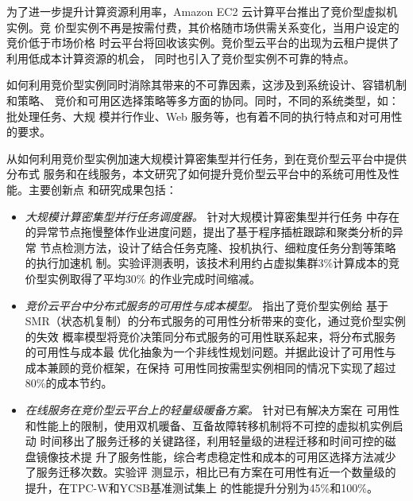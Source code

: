 \begin{cabstract}
  为了进一步提升计算资源利用率，Amazon EC2 云计算平台推出了竞价型虚拟机实例。竞
  价型实例不再是按需付费，其价格随市场供需关系变化，当用户设定的竞价低于市场价格
  时云平台将回收该实例。竞价型云平台的出现为云租户提供了利用低成本计算资源的机会，
  同时也引入了竞价型实例不可靠的特点。

  如何利用竞价型实例同时消除其带来的不可靠因素，这涉及到系统设计、容错机制和策略、
  竞价和可用区选择策略等多方面的协同。同时，不同的系统类型，如：批处理任务、大规
  模并行作业、Web 服务等，也有着不同的执行特点和对可用性的要求。

  从如何利用竞价型实例加速大规模计算密集型并行任务，到在竞价型云平台中提供分布式
  服务和在线服务，本文研究了如何提升竞价型云平台中的系统可用性及性能。主要创新点
  和研究成果包括：
  \begin{itemize}
    \item \emph{大规模计算密集型并行任务调度器。} 针对大规模计算密集型并行任务
    中存在的异常节点拖慢整体作业进度问题，提出了基于程序插桩跟踪和聚类分析的异常
    节点检测方法，设计了结合任务克隆、投机执行、细粒度任务分割等策略的执行加速机
    制。实验评测表明，该技术利用约占虚拟集群3\%计算成本的竞价型实例取得了平均30\%
    的作业完成时间缩减。
    \item \emph{竞价云平台中分布式服务的可用性与成本模型。} 指出了竞价型实例给
    基于SMR（状态机复制）的分布式服务的可用性分析带来的变化，通过竞价型实例的失效
    概率模型将竞价决策同分布式服务的可用性联系起来，将分布式服务的可用性与成本最
    优化抽象为一个非线性规划问题。并据此设计了可用性与成本兼顾的竞价框架，在保持
    可用性同按需型实例相同的情况下实现了超过80\%的成本节约。
    \item \emph{在线服务在竞价型云平台上的轻量级暖备方案。} 针对已有解决方案在
    可用性和性能上的限制，使用双机暖备、互备故障转移机制将不可控的虚拟机实例启动
    时间移出了服务迁移的关键路径，利用轻量级的进程迁移和时间可控的磁盘镜像技术提
    升了服务性能，综合考虑稳定性和成本的可用区选择方法减少了服务迁移次数。实验评
    测显示，相比已有方案在可用性有近一个数量级的提升，在TPC-W和YCSB基准测试集上
    的性能提升分别为45\%和100\%。
  \end{itemize}

\end{cabstract}


